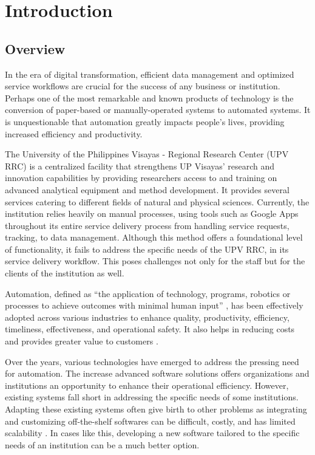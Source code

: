 \chapter{Introduction}
\label{sec:researchdesc}    %

\section{Overview}
\label{sec:overview}

In the era of digital transformation, efficient data management and optimized service workflows are crucial for the success of any business or institution. Perhaps one of the most remarkable and known products of technology is the conversion of paper-based or manually-operated systems to automated systems. It is unquestionable that automation greatly impacts people's lives, providing increased efficiency and productivity.

The University of the Philippines Visayas - Regional Research Center (UPV RRC) is a centralized facility that strengthens UP Visayas’ research and innovation capabilities by providing researchers access to and training on advanced analytical equipment and method development. It provides several services catering to different fields of natural and physical sciences. Currently, the institution relies heavily on manual processes, using tools such as Google Apps throughout its entire service delivery process from handling service requests, tracking, to data management. Although this method offers a foundational level of functionality, it fails to address the specific needs of the UPV RRC, in its service delivery workflow. This poses challenges not only for the staff but for the clients of the institution as well. 

Automation, defined as “the application of technology, programs, robotics or processes to achieve outcomes with minimal human input” \cite{ibm}, has been effectively adopted across various industries to enhance quality, productivity, efficiency, timeliness, effectiveness, and operational safety. It also helps in reducing costs and provides greater value to customers \cite{caban2021}. 

Over the years, various technologies have emerged to address the pressing need for automation. The increase advanced software solutions offers organizations and institutions an opportunity to enhance their operational efficiency. However, existing systems fall short in addressing the specific needs of some institutions. Adapting these existing systems often give birth to other problems as integrating and customizing off-the-shelf softwares can be difficult, costly, and has limited scalability \cite{bitcat2023}. In cases like this, developing a new software tailored to the specific needs of an institution can be a much better option.

